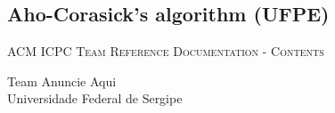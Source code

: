 \documentclass[a4paper]{amsart}
\begin{document}
    \subsection{Aho-Corasick's algorithm (UFPE)}

  \enlargethispage*{\baselineskip}
  \pagebreak

  \enlargethispage*{\baselineskip}
  \begin{center}
    \Huge\textsc{ACM ICPC Team Reference Documentation - Contents}

    \vspace{0.35cm}

    \huge Team Anuncie Aqui \\ Universidade Federal de Sergipe

    \vspace{0.35cm}

  \end{center}

  \begin{multicols}{2}
    \tableofcontents
  \end{multicols}
\end{document}
